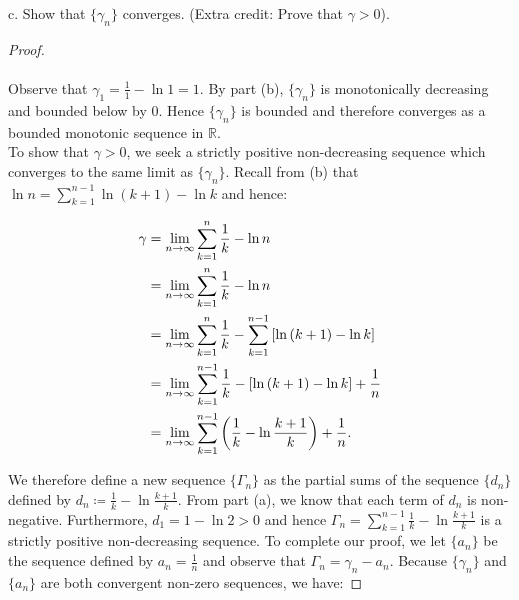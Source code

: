     \pagebreak

c.  Show that $\{\gamma_n\}$ converges. (Extra credit: Prove that $\gamma > 0$).

    \begin{proof}\ \\\\
        Observe that $\gamma_1 = \frac{1}{1} - \ln{1} = 1$. By part (b),
        $\{\gamma_n\}$ is monotonically decreasing and bounded below by 0. Hence 
        $\{\gamma_n\}$ is bounded and therefore converges as a bounded monotonic
        sequence in $\mathbb{R}$.
        \\

        To show that $\gamma > 0$, we seek a strictly positive non-decreasing
        sequence which converges to the same limit as $\{\gamma_n\}$. Recall
        from (b) that $\ln{n} = \sum\limits_{k=1}^{n-1}{\ln{(k+1)} - \ln{k}}$
        and hence:

        \begin{align*}
            \gamma &= {\lim_{n \rightarrow \infty}{\sum\limits_{k=1}^n{\frac{1}{k}} - \ln{n}}} \\
                   &= {\lim_{n \rightarrow \infty}{\sum\limits_{k=1}^n{\frac{1}{k}} - \ln{n}}} \\
                   &= {\lim_{n \rightarrow \infty}{\sum\limits_{k=1}^n{\frac{1}{k}} - \sum\limits_{k=1}^{n-1}{\left[
                        \ln{(k+1)} - \ln k
                      \right]}}} \\
                   &= {\lim_{n \rightarrow \infty}{\sum\limits_{k=1}^{n-1}{\frac{1}{k} - \left[
                        \ln{(k+1)} - \ln k
                      \right]} + \frac{1}{n}}} \\
                   &= {\lim_{n \rightarrow \infty}{\sum\limits_{k=1}^{n-1}{\left(
                        \frac{1}{k} - \ln{\frac{k+1}{k}}
                      \right)} + \frac{1}{n}}}.
        \end{align*}

        We therefore define a new sequence $\{\Gamma_n\}$ as the partial sums of
        the sequence $\{d_n\}$ defined by
        $d_n \coloneqq \frac{1}{k} - \ln{\frac{k+1}{k}}$. From part (a), we know
        that each term of $d_n$ is non-negative. Furthermore,
        $d_1 = 1 - \ln{2} > 0$ and hence
        $\Gamma_n = \sum\limits_{k=1}^{n-1}{\frac{1}{k} - \ln{\frac{k+1}{k}}}$ 
        is a strictly positive non-decreasing sequence. To complete our proof,
        we let $\{a_n\}$ be the sequence defined by $a_n = \frac{1}{n}$ and
        observe that $\Gamma_n = \gamma_n - a_n$. Because $\{\gamma_n\}$ and 
        $\{a_n\}$ are both convergent non-zero sequences, we have:
        

\end{proof}
